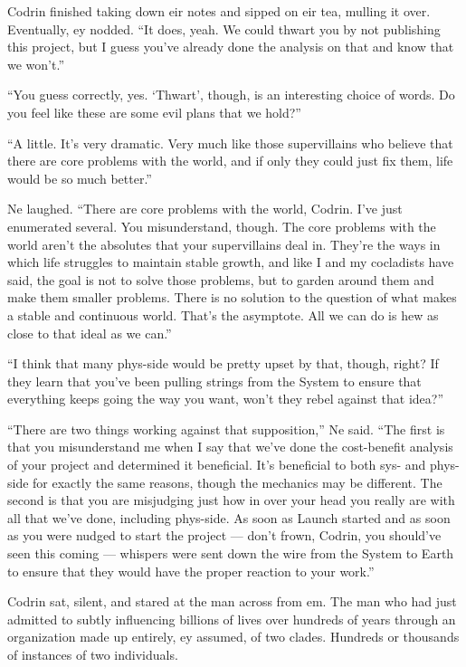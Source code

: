 Codrin finished taking down eir notes and sipped on eir tea, mulling it over. Eventually, ey nodded. ``It does, yeah. We could thwart you by not publishing this project, but I guess you've already done the analysis on that and know that we won't.''

``You guess correctly, yes. `Thwart', though, is an interesting choice of words. Do you feel like these are some evil plans that we hold?''

``A little. It's very dramatic. Very much like those supervillains who believe that there are core problems with the world, and if only they could just fix them, life would be so much better.''

Ne laughed. ``There are core problems with the world, Codrin. I've just enumerated several. You misunderstand, though. The core problems with the world aren't the absolutes that your supervillains deal in. They're the ways in which life struggles to maintain stable growth, and like I and my cocladists have said, the goal is not to solve those problems, but to garden around them and make them smaller problems. There is no solution to the question of what makes a stable and continuous world. That's the asymptote. All we can do is hew as close to that ideal as we can.''

``I think that many phys-side would be pretty upset by that, though, right? If they learn that you've been pulling strings from the System to ensure that everything keeps going the way you want, won't they rebel against that idea?''

``There are two things working against that supposition,'' Ne said. ``The first is that you misunderstand me when I say that we've done the cost-benefit analysis of your project and determined it beneficial. It's beneficial to both sys- and phys-side for exactly the same reasons, though the mechanics may be different. The second is that you are misjudging just how in over your head you really are with all that we've done, including phys-side. As soon as Launch started and as soon as you were nudged to start the project — don't frown, Codrin, you should've seen this coming — whispers were sent down the wire from the System to Earth to ensure that they would have the proper reaction to your work.''

Codrin sat, silent, and stared at the man across from em. The man who had just admitted to subtly influencing billions of lives over hundreds of years through an organization made up entirely, ey assumed, of two clades. Hundreds or thousands of instances of two individuals.

